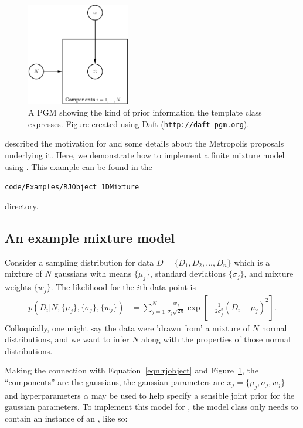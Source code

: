 \documentclass[article]{jss}
\begin{document}
\begin{figure}[ht!]
\begin{center}
\hspace*{-2cm}\includegraphics[width=0.4\textwidth]{figures/rjobject_pgm.pdf}
\caption{A PGM showing the kind of prior information the 
template class expresses.
Figure created using Daft ({\tt http://daft-pgm.org}).\label{fig:rjobject_pgm}}
\end{center}
\end{figure}

\citet{rjobject} described the motivation for  and some details
about the Metropolis proposals underlying it. Here, we demonstrate how to
implement a finite mixture model using .
This example can be found in the
\begin{center}
{\tt code/Examples/RJObject\_1DMixture}
\end{center}
directory.

\subsection{An example mixture model}
Consider a sampling distribution
for data $D=\{D_1, D_2, ..., D_n\}$ which is a mixture of $N$ gaussians
with means $\{\mu_j\}$, standard deviations $\{\sigma_j\}$, and
mixture weights $\{w_j\}$. The likelihood for the $i$th data point is
\begin{align}
p(D_i | N, \{\mu_j\}, \{\sigma_j\}, \{w_j\}) &=
\sum_{j=1}^N \frac{w_j}{\sigma_j\sqrt{2\pi}}
\exp\left[-\frac{1}{2\sigma_j^2}\left(D_i - \mu_j\right)^2\right].
\end{align}
Colloquially, one might say the data were 'drawn from' a mixture of
$N$ normal distributions, and we want to infer $N$ along with the
properties of those normal distributions.

Making the connection with Equation~\ref{eqn:rjobject} and
Figure~\ref{fig:rjobject_pgm}, the ``components'' are the gaussians,
the gaussian parameters are $x_j = \{\mu_j, \sigma_j, w_j\}$
and hyperparameters $\alpha$ may be used to help specify
a sensible joint prior for the gaussian parameters.
To implement this model for , the model
class only needs to contain an instance of an
, like so:
\end{document}
